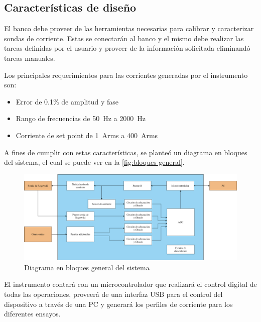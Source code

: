 \documentclass[titlepage, 12pt]{article}
\begin{document}
  \subsection{Características de diseño}
  El banco debe proveer de las herramientas necesarias para calibrar y caracterizar sondas de corriente. Estas se conectarán al banco y el mismo debe realizar las tareas definidas por el usuario y proveer de la información solicitada eliminandó tareas manuales.

  Los principales requerimientos para las corrientes generadas por el instrumento son:

      \begin{itemize}
          \item Error de 0.1\% de amplitud y fase
          \item Rango de frecuencias de \SI{50}{Hz} a \SI{2000}{Hz}
          \item Corriente de set point de \SI{1}{Arms} a \SI{400}{Arms}
      \end{itemize}

  A fines de cumplir con estas características, se planteó un diagrama en bloques del sistema, el cual se puede ver en la \autoref{fig:bloques-general}.

      \begin{figure}[!htbp]
          \centering
          \includegraphics[width=\textwidth]{diagrams/bloques-general.png}
          \caption{Diagrama en bloques general del sistema}
          \label{fig:bloques-general}
      \end{figure}

  El instrumento contará con un microcontrolador que realizará el control digital de todas las operaciones, proveerá de una interfaz USB para el control del dispositivo a través de una PC y generará los perfiles de corriente para los diferentes ensayos.
\end{document}
